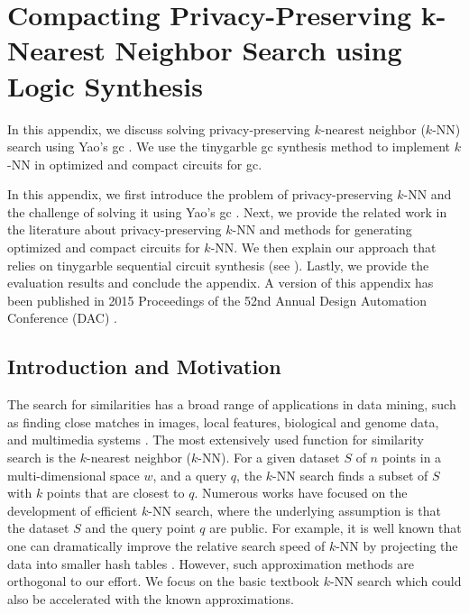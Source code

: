 \chapter{Compacting Privacy-Preserving k-Nearest Neighbor Search using Logic Synthesis}\label{chap:knn}
In this appendix, we discuss solving privacy-preserving $k$-nearest neighbor ($k$-NN) search using Yao's \acrfull{gc}  .
We use the \gls{tinygarble} \acrshort{gc} synthesis method to implement $k$-NN in optimized and compact circuits for \acrshort{gc}.

In this appendix, we first introduce the problem of privacy-preserving $k$-NN and the challenge of solving it using Yao's \acrshort{gc}  .
Next, we provide the related work in the literature about privacy-preserving $k$-NN and methods for generating optimized and compact circuits for $k$-NN.
We then explain our approach that relies on \gls{tinygarble} sequential circuit synthesis (see ).
Lastly, we provide the evaluation results and conclude the appendix.
A version of this appendix has been published in 2015 Proceedings of the 52nd Annual Design Automation Conference (DAC) \cite{songhori2015compacting}.

\section{Introduction and Motivation}\label{sec:knn-intro}
The search for similarities has a broad range of applications in data mining, such as finding close matches in images, local features, biological and genome data, and multimedia systems \cite{qi2008efficient}.
The most extensively used function for similarity search is the $k$-nearest neighbor ($k$-NN).
For a given dataset $S$ of $n$ points in a multi-dimensional space $w$, and a query $q$, the $k$-NN search finds a subset of $S$ with $k$ points that are closest to $q$.
Numerous works have focused on the development of efficient $k$-NN search, where the underlying assumption is that the dataset $S$ and the query point $q$ are public.
For example, it is well known that one can dramatically improve the relative search speed of $k$-NN by projecting the data into smaller hash tables \cite{andoni2006near,weiss2009spectral}.
However, such approximation methods are orthogonal to our effort.
We focus on the basic textbook $k$-NN search which could also be accelerated with the known approximations.

